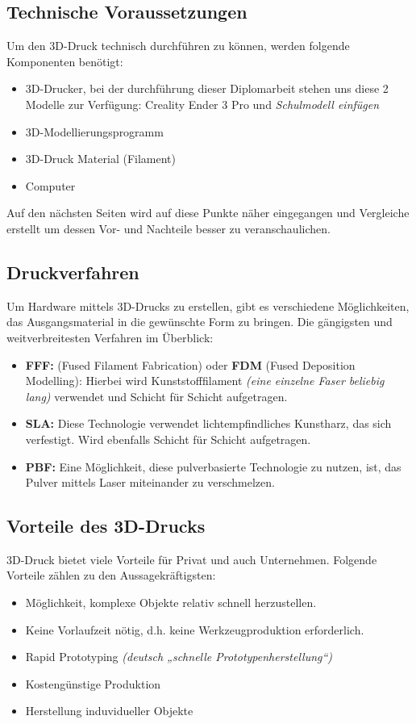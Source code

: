 \subsection{Technische Voraussetzungen}
Um den 3D-Druck technisch durchführen zu können, werden folgende Komponenten benötigt:
\begin{itemize} 
	\item 3D-Drucker, bei der durchführung dieser Diplomarbeit stehen uns diese 2 Modelle zur Verfügung: Creality Ender 3 Pro und \emph{Schulmodell einfügen}
	\item 3D-Modellierungsprogramm
	\item 3D-Druck Material (Filament)
	\item Computer
\end{itemize}
Auf den nächsten Seiten wird auf diese Punkte näher eingegangen und Vergleiche erstellt um dessen Vor- und Nachteile besser zu veranschaulichen. \cite{3ds}


\subsection{Druckverfahren}

Um Hardware mittels 3D-Drucks zu erstellen, gibt es verschiedene Möglichkeiten, das Ausgangsmaterial in die gewünschte Form zu bringen. Die gängigsten und weitverbreitesten Verfahren im Überblick: 

\begin{itemize}
	\item \textbf{FFF:} (Fused Filament Fabrication) oder \textbf{FDM} (Fused Deposition Modelling): Hierbei wird Kunststofffilament \emph{(eine einzelne Faser beliebig lang)} verwendet und Schicht für Schicht aufgetragen.
	\item \textbf{SLA:} Diese Technologie verwendet lichtempfindliches Kunstharz, das sich verfestigt. Wird ebenfalls Schicht für Schicht aufgetragen.
	\item \textbf{PBF:} Eine Möglichkeit, diese pulverbasierte Technologie zu nutzen, ist, das Pulver mittels Laser miteinander zu verschmelzen. \cite{kaffka} \cite{3ds}
\end{itemize}


\subsection{Vorteile des 3D-Drucks}
3D-Druck bietet viele Vorteile für Privat und auch Unternehmen. Folgende Vorteile zählen zu den Aussagekräftigsten:
\begin{itemize}
	\item Möglichkeit, komplexe Objekte relativ schnell herzustellen.
	\item Keine Vorlaufzeit nötig, d.h. keine Werkzeugproduktion erforderlich.
	\item Rapid Prototyping \emph{(deutsch „schnelle Prototypenherstellung“)}
	\item Kostengünstige Produktion
	\item Herstellung induvidueller Objekte
\end{itemize} \cite{3D-Druck-Vorteile}


